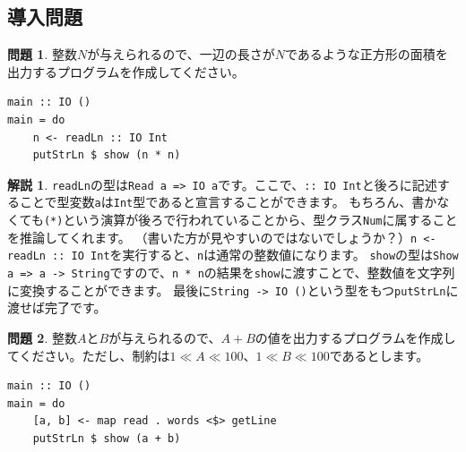 \documentclass[12pt,a4paper,dvipdfmx,fleqn]{article}%
\theoremstyle{definition}
\newtheorem*{toi*}{問題}
\theoremstyle{definition}
\newtheorem*{ans*}{解説}
\theoremstyle{definition}
\newcommand{\ttt}[1]{\texttt{#1}} %
\begin{document}
\subsection{導入問題}\label{導入問題}
\begin{toi*}
    整数$N$が与えられるので、一辺の長さが$N$であるような正方形の面積を出力するプログラムを作成してください。
\end{toi*}
\begin{lstlisting}[caption=A01.hs,label=A01]
main :: IO ()
main = do
    n <- readLn :: IO Int
    putStrLn $ show (n * n)
\end{lstlisting}
\begin{ans*}
    \ttt{readLn}の型は\ttt{Read a => IO a}です。ここで、\ttt{:: IO Int}と後ろに記述することで型変数\ttt{a}は\ttt{Int}型であると宣言することができます。
    もちろん、書かなくても\ttt{(*)}という演算が後ろで行われていることから、型クラス\ttt{Num}に属することを推論してくれます。
    （書いた方が見やすいのではないでしょうか？）\ttt{n <- readLn :: IO Int}を実行すると、\ttt{n}は通常の整数値になります。
    \ttt{show}の型は\ttt{Show a => a -> String}ですので、\ttt{n * n}の結果を\ttt{show}に渡すことで、整数値を文字列に変換することができます。
    最後に\ttt{String -> IO ()}という型をもつ\ttt{putStrLn}に渡せば完了です。
\end{ans*}
\begin{toi*}
    整数$A$と$B$が与えられるので、$A+B$の値を出力するプログラムを作成してください。ただし、制約は$1\ll A\ll 100$、$1\ll B\ll 100$であるとします。
\end{toi*}
\begin{lstlisting}[caption=B01.hs,label=B01]
main :: IO ()
main = do
    [a, b] <- map read . words <$> getLine
    putStrLn $ show (a + b)
\end{lstlisting}
\end{document}
